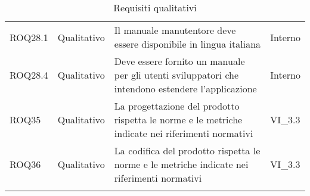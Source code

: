 \begin{longtable}{p{2cm}!{\VRule[1pt]}p{2cm}!{\VRule[1pt]}p{5cm}!{\VRule[1pt]}p{1.5cm}}
	ROQ28.1&Qualitativo\newline  & Il manuale manutentore deve essere disponibile in lingua italiana & Interno \\
	ROQ28.4&Qualitativo\newline  & Deve essere fornito un manuale per gli utenti sviluppatori che intendono estendere l'applicazione & Interno \\
	ROQ35&Qualitativo\newline  & La progettazione del prodotto rispetta le norme e le metriche indicate nei riferimenti normativi & VI_3.3 \\
	ROQ36&Qualitativo\newline  & La codifica del prodotto rispetta le norme e le metriche indicate nei riferimenti normativi & VI_3.3 \\
	\caption{Requisiti qualitativi}
\end{longtable}
